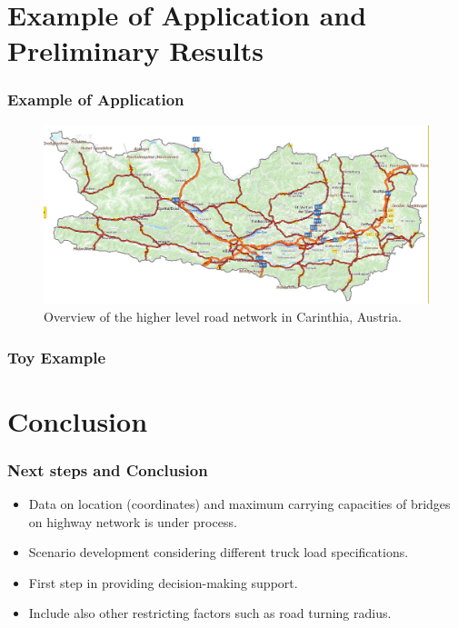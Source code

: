 \documentclass{beamer}   %
\theoremstyle{break}
\begin{document}
  \section[Example of Application] {Example of Application and Preliminary Results}
  \begin{frame}
    \frametitle{Example of Application}
    \begin{figure}[!ht]
      \centering
      \includegraphics[width=1.0\textwidth]{../manuscript/figures/map.jpg}
      \caption{Overview of the higher level road network in Carinthia, Austria.}
      \label{fig:higher level}
    \end{figure}
  \end{frame}





  \begin{frame}
    \frametitle{Toy Example}
    \begin{figure}[!ht]
      \centering
      \scalebox{0.5}{
      
      }
    \end{figure}
  \end{frame}


  \section[Next Steps and Conclusion] {Conclusion}

  \begin{frame}
    \frametitle{Next steps and Conclusion}
    \begin{itemize}
      \item Data on location (coordinates) and maximum carrying capacities of bridges on highway network is under process.
      \item Scenario development considering different truck load specifications.
	\item First step in providing decision-making support.
	\item Include also other restricting factors such as road turning radius.
    \end{itemize}

  \end{frame}
\end{document}
